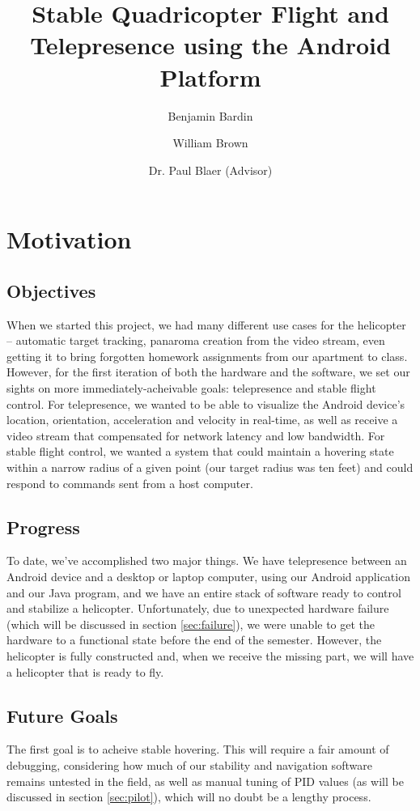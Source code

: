 \documentclass[letterpaper]{article}
\author{Benjamin Bardin \and William Brown 
  \and Dr. Paul Blaer (Advisor)}
\title{Stable Quadricopter Flight and 
  Telepresence using the Android Platform}
\begin{document}
\maketitle
\tableofcontents
\newpage

\section{Motivation}
\subsection{Objectives}
When we started this project, we had many different use cases for the
helicopter -- automatic target tracking, panaroma creation from the
video stream, even getting it to bring forgotten homework assignments
from our apartment to class. However, for the first iteration of both
the hardware and the software, we set our sights on more
immediately-acheivable goals: telepresence and stable flight
control. For telepresence, we wanted to be able to visualize the
Android device's location, orientation, acceleration and velocity in
real-time, as well as receive a video stream that compensated for
network latency and low bandwidth. For stable flight control, we
wanted a system that could maintain a hovering state within a narrow
radius of a given point (our target radius was ten feet) and could
respond to commands sent from a host computer.

\subsection{Progress}
To date, we've accomplished two major things. We have telepresence
between an Android device and a desktop or laptop computer, using our
Android application and our Java program, and we have an entire stack
of software ready to control and stabilize a
helicopter. Unfortunately, due to unexpected hardware failure (which
will be discussed in section \ref{sec:failure}), we were unable to get
the hardware to a functional state before the end of the
semester. However, the helicopter is fully constructed and, when we
receive the missing part, we will have a helicopter that is ready to
fly.

\subsection{Future Goals}
The first goal is to acheive stable hovering. This will require a fair
amount of debugging, considering how much of our stability and
navigation software remains untested in the field, as well as manual
tuning of PID values (as will be discussed in section
\ref{sec:pilot}), which will no doubt be a lengthy process.
\end{document}
